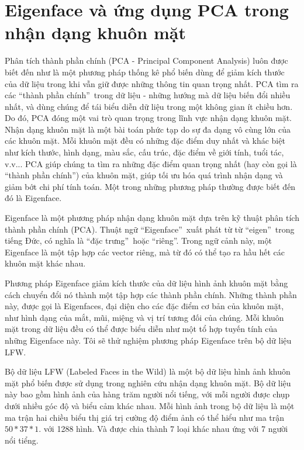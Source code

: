 \documentclass[12pt,a4paper,oneside]{report}
\numberwithin{equation}{section}
\begin{document}
\section{Eigenface và ứng dụng PCA trong nhận dạng khuôn mặt}
Phân tích thành phần chính (PCA - Principal Component Analysis) luôn được biết đến như là một phương pháp thống kê phổ biến dùng để giảm kích thước của dữ liệu trong khi vẫn giữ được những thông tin quan trọng nhất. PCA tìm ra các \textquotedblleft thành phần chính\textquotedblright\  trong dữ liệu - những hướng mà dữ liệu biến đổi nhiều nhất, và dùng chúng để tái biểu diễn dữ liệu trong một không gian ít chiều hơn. Do đó, PCA đóng một vai trò quan trọng trong lĩnh vực nhận dạng khuôn mặt. Nhận dạng khuôn mặt là một bài toán phức tạp do sự đa dạng vô cùng lớn của các khuôn mặt. Mỗi khuôn mặt đều có những đặc điểm duy nhất và khác biệt như kích thước, hình dạng, màu sắc, cấu trúc, đặc điểm về giới tính, tuổi tác, v.v... PCA giúp chúng ta tìm ra những đặc điểm quan trọng nhất (hay còn gọi là \textquotedblleft thành phần chính\textquotedblright) của khuôn mặt, giúp tối ưu hóa quá trình nhận dạng và giảm bớt chi phí tính toán. Một trong những phương pháp thường được biết đến đó là Eigenface.

Eigenface là một phương pháp nhận dạng khuôn mặt dựa trên kỹ thuật phân tích thành phần chính (PCA). Thuật ngữ \textquotedblleft Eigenface\textquotedblright\ xuất phát từ từ \textquotedblleft eigen\textquotedblright\ trong tiếng Đức, có nghĩa là \textquotedblleft đặc trưng\textquotedblright\ hoặc  \textquotedblleft riêng\textquotedblright. Trong ngữ cảnh này, một Eigenface là một tập hợp các vector riêng, mà từ đó có thể tạo ra hầu hết các khuôn mặt khác nhau.

Phương pháp Eigenface giảm kích thước của dữ liệu hình ảnh khuôn mặt bằng cách chuyển đổi nó thành một tập hợp các thành phần chính. Những thành phần này, được gọi là Eigenfaces, đại diện cho các đặc điểm cơ bản của khuôn mặt, như hình dạng của mắt, mũi, miệng và vị trí tương đối của chúng. Mỗi khuôn mặt trong dữ liệu đều có thể được biểu diễn như một tổ hợp tuyến tính của những Eigenface này. Tôi sẽ thử nghiệm phương pháp Eigenface trên bộ dữ liệu LFW.

Bộ dữ liệu LFW (Labeled Faces in the Wild)\cite{huang} là một bộ dữ liệu hình ảnh khuôn mặt phổ biến được sử dụng trong nghiên cứu nhận dạng khuôn mặt. Bộ dữ liệu này bao gồm hình ảnh của hàng trăm người nổi tiếng, với mỗi người được chụp dưới nhiều góc độ và biểu cảm khác nhau. Mỗi hình ảnh trong bộ dữ liệu là một ma trận hai chiều biểu thị giá trị cường độ điểm ảnh có thể hiểu như ma trận $50*37*1$. với 1288 hình. Và được chia thành 7 loại khác nhau ứng với 7 người nổi tiểng.
\end{document}
